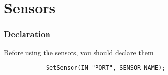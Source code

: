 \chapter{Sensors}
\subsection{Declaration}
	Before using the sensors, you should declare them
	\begin{lstlisting}
			SetSensor(IN_"PORT", SENSOR_NAME);
	\end{lstlisting}
